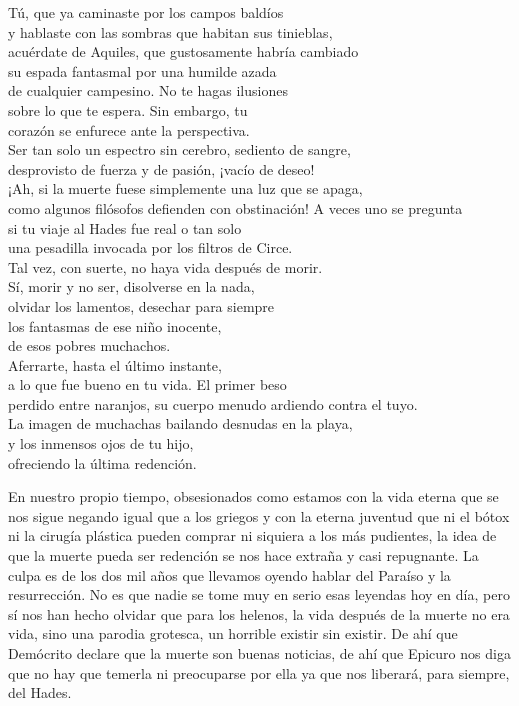 \begin{versopropio}
Tú, que ya caminaste por los campos baldíos\\
y hablaste con las sombras que habitan sus tinieblas,\\
acuérdate de Aquiles, que gustosamente habría cambiado\\
su espada fantasmal por una humilde azada\\
de cualquier campesino. No te hagas ilusiones\\
sobre lo que te espera. Sin embargo, tu\\
corazón se enfurece ante la perspectiva.\\
Ser tan solo un espectro sin cerebro, sediento de sangre,\\
desprovisto de fuerza y de pasión, ¡vacío de deseo!\\
¡Ah, si la muerte fuese simplemente una luz que se apaga,\\
como algunos filósofos defienden con obstinación!
\stanzabreak
A veces uno se pregunta\\
si tu viaje al Hades fue real o tan solo\\
una pesadilla invocada por los filtros de Circe.\\
Tal vez, con suerte, no haya vida después de morir.\\
Sí, morir y no ser, disolverse en la nada,\\
olvidar los lamentos, desechar para siempre\\
los fantasmas de ese niño inocente,\\
de esos pobres muchachos.\\
Aferrarte, hasta el último instante,\\
a lo que fue bueno en tu vida. El primer beso\\
perdido entre naranjos, su cuerpo menudo ardiendo contra el tuyo.\\
La imagen de muchachas bailando desnudas en la playa,\\
y los inmensos ojos de tu hijo,\\
ofreciendo la última redención.
\end{versopropio}

En nuestro propio tiempo, obsesionados como estamos con la vida eterna que se nos sigue negando igual que a los griegos y con la eterna juventud que ni el bótox ni la cirugía plástica pueden comprar ni siquiera a los más pudientes, la idea de que la muerte pueda ser redención se nos hace extraña y casi repugnante. La culpa es de los dos mil años que llevamos oyendo hablar del Paraíso y la resurrección. No es que nadie se tome muy en serio esas leyendas hoy en día, pero sí nos han hecho olvidar que para los helenos, la vida después de la muerte no era vida, sino una parodia grotesca, un horrible existir sin existir. De ahí que Demócrito declare que la muerte son buenas noticias, de ahí que Epicuro nos diga que no hay que temerla ni preocuparse por ella ya que nos liberará, para siempre, del Hades.
